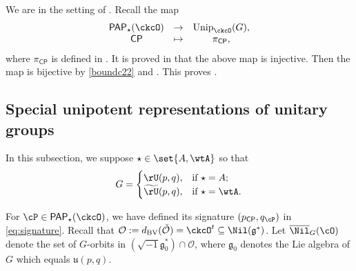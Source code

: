 \documentclass[12pt]{amsart}
\def\subset{\subseteq}
\def\Im{\operatorname{Im}}
\newcommand{\CO}{{\mathcal {O}}}
\newcommand{\CP}{{\mathcal {P}}}
\newcommand{\g}{\mathfrak g}
\renewcommand{\u}{\mathfrak u}
\numberwithin{equation}{section}
\theoremstyle{remark}
\def\Unip{\mathrm{Unip}}
\def\dBV{d_{\mathrm{BV}}}
\def\CP{\mathsf{CP}}
\def\PP{\mathsf{PAP}}
\def\tU{\widetilde{\rU}}
\def\Im{\mathrm{Im}}
\begin{document}
We are in the setting of . Recall the map
  \[
    \begin{array}{ccc}
      \PP_{\star}(\ckcO) & \rightarrow & \Unip_{\ckcO}(G),\\
      \CP & \mapsto & \pi_{\CP{}},
    \end{array}
  \]
 where $\pi_{\CP}$ is defined in . It  is proved in  \cite[Theorem 3.8]{V.GL} that the above map is injective. Then   the map is bijective by \eqref{boundc22} and . This proves  .

\subsection{Special unipotent representations of unitary groups}\label{secunit}

In this subsection, we suppose  $\star \in \set{A, \wtA}$ so that
\[
  G =
  \begin{cases}
    \rU(p,q),  & \text{if }\star = A;\\
    \tU(p,q),  & \text{if }\star = \wtA.
\end{cases}
\]


For $\cP \in \PP_{\star}(\ckcO)$, we have defined its signature $(p_\CP, q_\cP)$ in \eqref{eq:signature}. Recall that $\CO:=\dBV(\check \CO)=\ckcO^t\subset \Nil(\g^*)$.  Let $\overline \Nil_{G}(\cO)$ denote the set of $G$-orbits in $(\sqrt{-1}\g_0^*)\cap \CO$, where $\g_0$ denotes the Lie algebra of $G$ which equals $\u(p,q)$.
\end{document}
